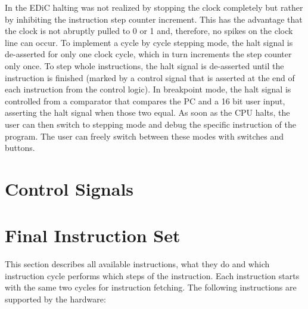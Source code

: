 In the \gls{EDiC} halting was not realized by stopping the clock completely but rather by inhibiting the instruction step counter increment.
This has the advantage that the clock is not abruptly pulled to 0 or 1 and, therefore, no spikes on the clock line can occur.
To implement a cycle by cycle stepping mode, the halt signal is de-asserted for only one clock cycle, which in turn increments the step counter only once.
To step whole instructions, the halt signal is de-asserted until the instruction is finished (marked by a control signal that is asserted at the end of each instruction from the control logic).
In breakpoint mode, the halt signal is controlled from a comparator that compares the \gls{PC} and a 16 bit user input, asserting the halt signal when those two equal.
As soon as the \gls{CPU} halts, the user can then switch to stepping mode and debug the specific instruction of the program.
The user can freely switch between these modes with switches and buttons.
\section{Control Signals}\label{sec:controlSignals}
\section{Final Instruction Set}\label{sec:instructionSet}
This section describes all available instructions, what they do and which instruction cycle performs which steps of the instruction.
Each instruction starts with the same two cycles for instruction fetching.
The following instructions are supported by the hardware:
